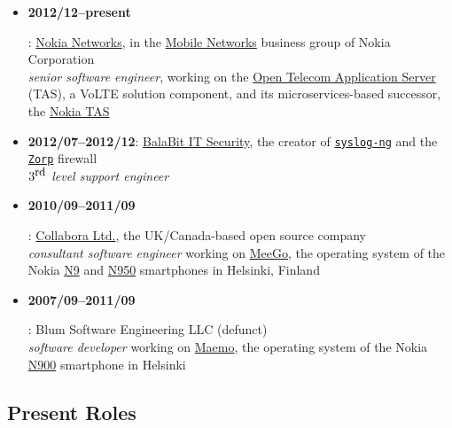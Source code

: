 \documentclass[a4paper,12pt]{article}
\newcommand{\compress}{\setlength\itemsep{-\parskip}}
\newenvironment{compressedItemize}{\begin{itemize}\compress}{\end{itemize}}
\begin{document}
\begin{compressedItemize}
\item	\hypertarget{TAS}{\textbf{2012/12--present}}: %
	\href{http://networks.nokia.com}{Nokia Networks}, in the
	\href{http://www.nokia.com/en_int/about-us/who-we-are/our-businesses/mobile-networks}{Mobile Networks} business group of Nokia Corporation \\
	\textit{senior software engineer}, working on the
	\href{http://networks.nokia.com/products/open-telecom-application-server-tas-old}{Open Telecom Application Server} (TAS), a VoLTE solution component,
	and its microservices-based successor, the \href{http://networks.nokia.com/products/telecom-application-server}{Nokia TAS}
\item	\textbf{2012/07--2012/12}:
	\href{http://www.balabit.com/solutions/business}{BalaBit IT Security},
	the creator of \href{http://www.balabit.com/network-security/syslog-ng/opensource-logging-system}{\texttt{syslog-ng}} and the
	\href{http://www.balabit.com/network-security/zorp-gpl}%
	{\texttt{Zorp}} firewall \\
	\textit{$3^{\textrm{\small rd}}$ level support engineer}
\item	\hypertarget{MeeGo}{\textbf{2010/09--2011/09}}:
	\href{http://www.collabora.com/about-us}{Collabora Ltd.},
	the UK/Canada-based open source company \\
	\textit{consultant software engineer} working on
	\href{http://en.wikipedia.org/wiki/MeeGo}{MeeGo}, the operating system
	of the Nokia \href{http://en.wikipedia.org/wiki/Nokia_N9}{N9} and
	\href{http://en.wikipedia.org/wiki/Nokia_N950}{N950} smartphones
	in Helsinki, Finland
\item	\hypertarget{Maemo}{\textbf{2007/09--2011/09}}:
	Blum Software Engineering LLC (defunct) \\
	\textit{software developer} working on \href{http://maemo.org}{Maemo},
	the operating system of the Nokia
	\href{http://maemo.org/intro/maemo_history}{N900} smartphone
	in Helsinki
\end{compressedItemize}

\subsection*{Present Roles}
\end{document}
